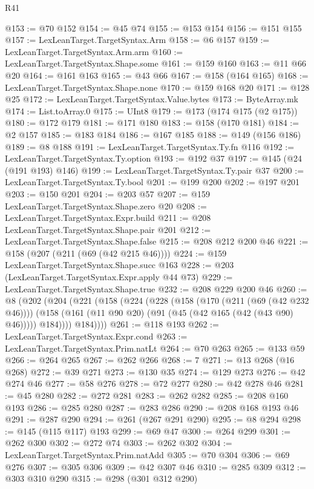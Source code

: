 \begin{lexlean}{R41}
\begin{coremodule}
@153 := @70 @152
@154 := @45 @74
@155 := @153 @154
@156 := @151 @155
@157 := LexLeanTarget.TargetSyntax.Arm
@158 := @6 @157
@159 := LexLeanTarget.TargetSyntax.Arm.arm
@160 := LexLeanTarget.TargetSyntax.Shape.some
@161 := @159 @160
@163 := @11 @66 @20
@164 := @161 @163
@165 := @43 @66
@167 := @158 (@164 @165)
@168 := LexLeanTarget.TargetSyntax.Shape.none
@170 := @159 @168 @20
@171 := @128 @25
@172 := LexLeanTarget.TargetSyntax.Value.bytes
@173 := ByteArray.mk
@174 := List.toArray.{0}
@175 := UInt8
@179 := @173 (@174 @175 (@2 @175))
@180 := @172 @179
@181 := @171 @180
@183 := @158 (@170 @181)
@184 := @2 @157
@185 := @183 @184
@186 := @167 @185
@188 := @149 (@156 @186)
@189 := @8 @188
@191 := LexLeanTarget.TargetSyntax.Ty.fn @116
@192 := LexLeanTarget.TargetSyntax.Ty.option
@193 := @192 @37
@197 := @145 (@24 (@191 @193) @146)
@199 := LexLeanTarget.TargetSyntax.Ty.pair @37
@200 := LexLeanTarget.TargetSyntax.Ty.bool
@201 := @199 @200
@202 := @197 @201
@203 := @150 @201
@204 := @203 @57
@207 := @159 LexLeanTarget.TargetSyntax.Shape.zero @20
@208 := LexLeanTarget.TargetSyntax.Expr.build
@211 := @208 LexLeanTarget.TargetSyntax.Shape.pair @201
@212 := LexLeanTarget.TargetSyntax.Shape.false
@215 := @208 @212 @200 @46
@221 := @158 (@207 (@211 (@69 (@42 @215 @46))))
@224 := @159 LexLeanTarget.TargetSyntax.Shape.succ @163
@228 := @203 (LexLeanTarget.TargetSyntax.Expr.apply @44 @73)
@229 := LexLeanTarget.TargetSyntax.Shape.true
@232 := @208 @229 @200 @46
@260 := @8
    (@202
      (@204
        (@221
          (@158
            (@224
              (@228
                (@158
                  (@170 (@211 (@69 (@42 @232 @46))))
                  (@158 (@161 (@11 @90 @20) (@91 (@45 (@42 @165 (@42 (@43 @90) @46))))) @184))))
            @184))))
@261 := @118 @193
@262 := LexLeanTarget.TargetSyntax.Expr.cond
@263 := LexLeanTarget.TargetSyntax.Prim.natLt
@264 := @70 @263
@265 := @133 @59
@266 := @264 @265
@267 := @262 @266
@268 := 7
@271 := @13 @268 (@16 @268)
@272 := @39 @271
@273 := @130 @35
@274 := @129 @273
@276 := @42 @274 @46
@277 := @58 @276
@278 := @72 @277
@280 := @42 @278 @46
@281 := @45 @280
@282 := @272 @281
@283 := @262 @282
@285 := @208 @160 @193
@286 := @285 @280
@287 := @283 @286
@290 := @208 @168 @193 @46
@291 := @287 @290
@294 := @261 (@267 @291 @290)
@295 := @8 @294
@298 := @145 (@115 @117) @193
@299 := @69 @47
@300 := @264 @299
@301 := @262 @300
@302 := @272 @74
@303 := @262 @302
@304 := LexLeanTarget.TargetSyntax.Prim.natAdd
@305 := @70 @304
@306 := @69 @276
@307 := @305 @306
@309 := @42 @307 @46
@310 := @285 @309
@312 := @303 @310 @290
@315 := @298 (@301 @312 @290)

\end{coremodule}
\end{lexlean}
